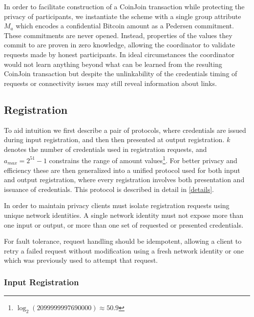 \documentclass{article}
\begin{document}
In order to facilitate construction of a CoinJoin transaction while protecting the privacy of participants, we instantiate the scheme with a single group attribute $M_a$ which encodes a confidential Bitcoin amount as a Pedersen commitment. These commitments are never opened. Instead, properties of the values they commit to are proven in zero knowledge, allowing the coordinator to validate requests made by honest participants. In ideal circumstances the coordinator would not learn anything beyond what can be learned from the resulting CoinJoin transaction but despite the unlinkability of the credentials timing of requests or connectivity issues may still reveal information about links.

\subsection{Registration}

To aid intuition we first describe a pair of protocols, where credentials are issued during input registration, and then then presented at output registration. $k$ denotes the number of credentials used in registration requests, and $a_{\mathit{max}} = 2^{51}-1$ constrains the range of amount values\footnote{$\log_2(2099999997690000) \approx 50.9$}. For better privacy and efficiency these are then generalized into a unified protocol used for both input and output registration, where every registration involves both presentation and issuance of credentials. This protocol is described in detail in \cref{details}.

In order to maintain privacy clients must isolate registration requests using unique network identities. A single network identity must not expose more than one input or output, or more than one set of requested or presented credentials.

For fault tolerance, request handling should be idempotent, allowing a client to retry a failed request without modification using a fresh network identity or one which was previously used to attempt that request.

\subsubsection{Input Registration}
\end{document}
